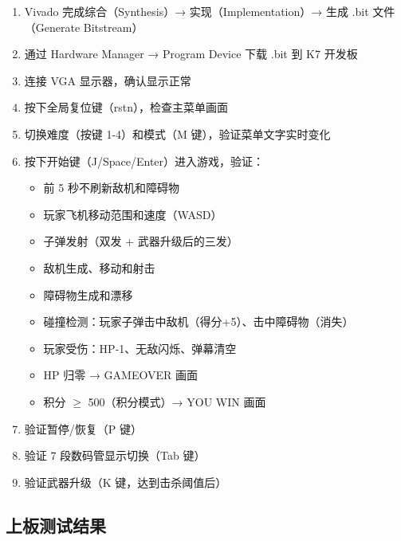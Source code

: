 \documentclass[12pt,a4paper]{ctexart}
\begin{document}
\begin{enumerate}[label=(\arabic*)]
    \item Vivado 完成综合（Synthesis）→ 实现（Implementation）→ 生成 .bit 文件（Generate Bitstream）
    \item 通过 Hardware Manager → Program Device 下载 .bit 到 K7 开发板
    \item 连接 VGA 显示器，确认显示正常
    \item 按下全局复位键（rstn），检查主菜单画面
    \item 切换难度（按键 1-4）和模式（M 键），验证菜单文字实时变化
    \item 按下开始键（J/Space/Enter）进入游戏，验证：
    \begin{itemize}
        \item 前 5 秒不刷新敌机和障碍物
        \item 玩家飞机移动范围和速度（WASD）
        \item 子弹发射（双发 + 武器升级后的三发）
        \item 敌机生成、移动和射击
        \item 障碍物生成和漂移
        \item 碰撞检测：玩家子弹击中敌机（得分+5）、击中障碍物（消失）
        \item 玩家受伤：HP-1、无敌闪烁、弹幕清空
        \item HP 归零 → GAMEOVER 画面
        \item 积分 $\ge$ 500（积分模式）→ YOU WIN 画面
    \end{itemize}
    \item 验证暂停/恢复（P 键）
    \item 验证 7 段数码管显示切换（Tab 键）
    \item 验证武器升级（K 键，达到击杀阈值后）
\end{enumerate}

\subsection{上板测试结果}
\end{document}
